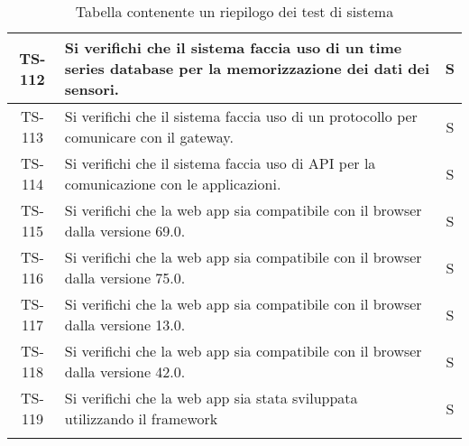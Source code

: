 \begin{center}
\begin{longtable}{|c|p{10cm}|c|}
			 \hline
			 TS-112 & Si verifichi che il sistema faccia uso di un time series database per la memorizzazione dei dati dei sensori. & S \\
			 \hline
			 TS-113 & Si verifichi che il sistema faccia uso di un protocollo per comunicare con il gateway. & S \\
			 \hline
			 TS-114 & Si verifichi che il sistema faccia uso di API per la comunicazione con le applicazioni. & S \\
			 \hline
			 TS-115 & Si verifichi che la web app sia compatibile con il browser \glock{Firefox} dalla versione 69.0. & S \\
			 \hline
			 TS-116 & Si verifichi che la web app sia compatibile con il browser \glock{Chrome} dalla versione 75.0. & S \\
			 \hline
			 TS-117 & Si verifichi che la web app sia compatibile con il browser \glock{Safari} dalla versione 13.0. & S \\
			 \hline
			 TS-118 & Si verifichi che la web app sia compatibile con il browser \glock{Edge} dalla versione 42.0. & S \\
			 \hline
			 TS-119 & Si verifichi che la web app sia stata sviluppata utilizzando il framework \glock{Bootstrap} & S \\
			 \hline

			 \caption{Tabella contenente un riepilogo dei test di sistema}
			\end{longtable}
		\end{center}
		
